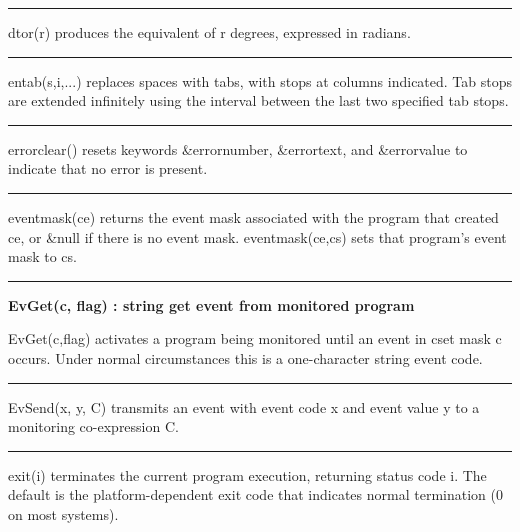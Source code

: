 \bigskip\hrule\vspace{0.1cm}

\noindent
{}dtor(r) produces the
equivalent of r degrees, expressed in radians.

\bigskip\hrule\vspace{0.1cm}

\noindent
entab(s,i,...) replaces spaces with tabs, with stops at columns
indicated. Tab stops are extended infinitely using the interval between
the last two specified tab stops.

\bigskip\hrule\vspace{0.1cm}

\noindent
{}errorclear() resets keywords \&errornumber,
\&errortext, and \&errorvalue to indicate that no error is present.

\bigskip\hrule\vspace{0.1cm}

\noindent
{}eventmask(ce) returns the event mask associated
with the program that created ce, or \&null if there is no event mask.
eventmask(ce,cs) sets that program's event mask to cs.

\bigskip\hrule\vspace{0.1cm}
\noindent
{\bf EvGet(c, flag) : string \hfill get event from monitored program}

\noindent
EvGet(c,flag) activates a program being monitored until an event in cset
mask c occurs. Under normal circumstances this is a one-character
string event code.

\bigskip\hrule\vspace{0.1cm}

\noindent
{}EvSend(x, y, C) transmits an event with event
code x and event value y to a monitoring co-expression C.

\bigskip\hrule\vspace{0.1cm}

\noindent
{}exit(i) terminates the current program execution,
returning status code i. The default is the platform-dependent exit
code that indicates normal termination (0 on most systems).

